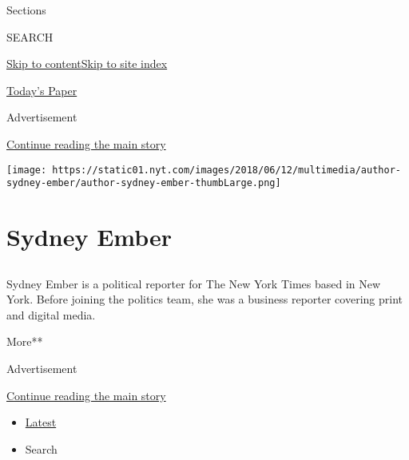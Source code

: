Sections

SEARCH

\protect\hyperlink{site-content}{Skip to
content}\protect\hyperlink{site-index}{Skip to site index}

\href{https://myaccount.nytimes.com/auth/login?response_type=cookie\&client_id=vi}{}

\href{https://www.nytimes.com/section/todayspaper}{Today's Paper}

Advertisement

\protect\hyperlink{after-top}{Continue reading the main story}

\texttt{[image: https://static01.nyt.com/images/2018/06/12/multimedia/author-sydney-ember/author-sydney-ember-thumbLarge.png]}

\hypertarget{sydney-ember}{%
\section{Sydney Ember}\label{sydney-ember}}

\subsection{}

Sydney Ember is a political reporter for The New York Times based in New
York. Before joining the politics team, she was a business reporter
covering print and digital media.

More**

Advertisement

\protect\hyperlink{after-mid1}{Continue reading the main story}

\begin{itemize}
\tightlist
\item
  \protect\hyperlink{stream-panel}{Latest}
\item
  Search
\end{itemize}

